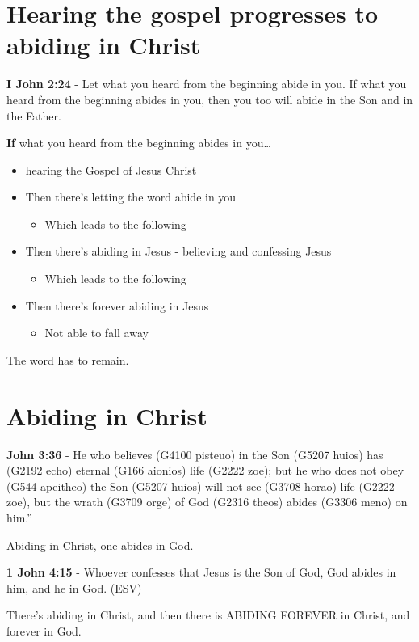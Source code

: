 \documentclass[11pt]{article}
\begin{document}
\section{Hearing the gospel progresses to abiding in Christ}
\label{sec:org47fd05d}
\textbf{I John 2:24} - Let what you heard from the beginning abide in you. If what you heard from the beginning abides in you, then you too will abide in the Son and in the Father.

\textbf{If} what you heard from the beginning abides in you\ldots{}

\begin{itemize}
\item hearing the Gospel of Jesus Christ
\item Then there's letting the word abide in you
\begin{itemize}
\item Which leads to the following
\end{itemize}
\item Then there's abiding in Jesus - believing and confessing Jesus
\begin{itemize}
\item Which leads to the following
\end{itemize}
\item Then there's forever abiding in Jesus
\begin{itemize}
\item Not able to fall away
\end{itemize}
\end{itemize}

The word has to remain.

\section{Abiding in Christ}
\label{sec:org977681f}
\textbf{John 3:36} - He who believes (G4100 pisteuo) in the Son (G5207 huios) has (G2192 echo) eternal (G166 aionios) life (G2222 zoe); but he who does not obey (G544 apeitheo) the Son (G5207 huios) will not see (G3708 horao) life (G2222 zoe), but the wrath (G3709 orge) of God (G2316 theos) abides (G3306 meno) on him.”

Abiding in Christ, one abides in God.

\textbf{1 John 4:15} - Whoever confesses that Jesus is the Son of God, God abides in him, and he in God. (ESV)

There's abiding in Christ, and then there is ABIDING FOREVER in Christ, and forever in God.
\end{document}
